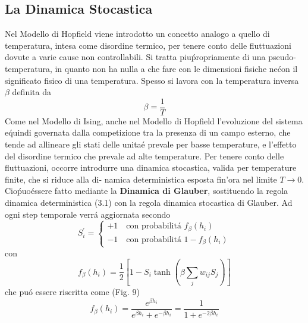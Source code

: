 \documentclass[12pt, a4paper]{book}
\theoremstyle{theorem}
\begin{document}
			\subsection{La Dinamica Stocastica}
				Nel Modello di Hopfield viene introdotto un concetto analogo a quello di temperatura, intesa come disordine termico, per tenere conto delle fluttuazioni dovute a varie cause non controllabili. Si tratta piu\' propriamente di una pseudo-temperatura, in quanto non ha nulla a che fare con le dimensioni fisiche ne\' con il significato fisico di una temperatura. Spesso si lavora con la temperatura inversa $\beta$ definita da
				\begin{equation}
					\beta = \frac{1}{T}
				\end{equation}
				Come nel Modello di Ising, anche nel Modello di Hopfield l’evoluzione del sistema e\' quindi governata dalla competizione tra la presenza di un campo esterno, che tende ad allineare gli stati delle unita\' e prevale per basse temperature, e l’effetto del disordine termico che prevale ad alte temperature. Per tenere conto delle fluttuazioni, occorre introdurre una dinamica stocastica, valida per temperature finite, che si riduce alla di- namica deterministica esposta fin’ora nel limite $T \rightarrow 0$. Cio\' puo\' essere fatto mediante la {\bf Dinamica di Glauber}, sostituendo la regola dinamica deterministica (3.1) con la regola dinamica stocastica di Glauber. Ad ogni step temporale verr\'a aggiornata secondo
				\begin{equation}
					S_i^\prime = 
					\begin{cases}
						+ 1 \quad \text{con probabilit\'a } f_\beta(h_i) \\
						-1 \quad \text{con probabilit\'a } 1 - f_\beta(h_i)
					\end{cases}
				\end{equation}
				con
				\begin{equation}
					f_\beta(h_i) = \frac{1}{2}\left[ 1 - S_i \tanh\left( \beta \sum_j w_{ij} S_j\right) \right]
				\end{equation}
				che pu\'o essere riscritta come (Fig. 9)
				\begin{equation}
					f_\beta(h_i) = \frac{e^{\beta h_i}}{e^{\beta h_i}+e^{-\beta h_i}} = \frac{1}{1+e^{-2\beta h_i}}
				\end{equation}
\end{document}
